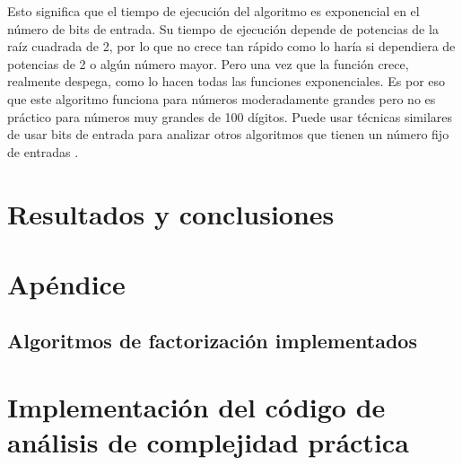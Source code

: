 \documentclass{article}
\begin{document}
Esto significa que el tiempo de ejecución del algoritmo es exponencial en el
número de bits de entrada. Su tiempo de ejecución depende de potencias de la
raíz cuadrada de 2, por lo que no crece tan rápido como lo haría si dependiera
de potencias de 2 o algún número mayor. Pero una vez que la función crece,
realmente despega, como lo hacen todas las funciones exponenciales. Es por eso
que este algoritmo funciona para números moderadamente grandes pero no es
práctico para números muy grandes de 100 dígitos. Puede usar técnicas similares
de usar bits de entrada para analizar otros algoritmos que tienen un número fijo
de entradas \cite{stephens2015learning}.

\section{Resultados y conclusiones}
 


 


\pagebreak
\section{Apéndice}

\subsection{Algoritmos de factorización implementados}



\pagebreak

\section{Implementación del código de análisis de complejidad práctica}



%
\end{document}
